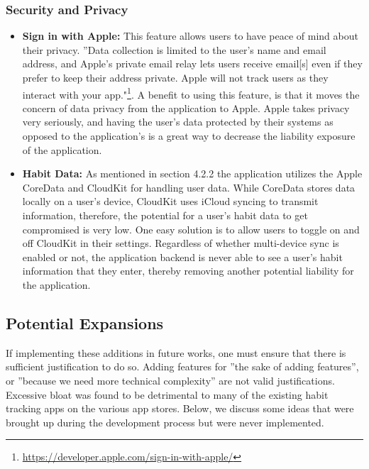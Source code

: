 \subsubsection{Security and Privacy}
\begin{itemize}
    \item \textbf{Sign in with Apple:} This feature allows users to have peace of mind about their privacy. ”Data collection is limited to the user’s name and email address, and Apple’s private email relay lets users receive email[s] even if they prefer to keep their address private. Apple will not track users as they interact with your app."\footnote{\url{https://developer.apple.com/sign-in-with-apple/}}. A benefit to using this feature, is that it moves the concern of data privacy from the application to Apple. Apple takes privacy very seriously, and having the user's data protected by their systems as opposed to the application's is a great way to decrease the liability exposure of the application.

    \item \textbf{Habit Data:} As mentioned in section 4.2.2 the application utilizes the Apple CoreData and CloudKit for handling user data. While CoreData stores data locally on a user’s device, CloudKit uses iCloud syncing to transmit information, therefore, the potential for a user’s habit data to get compromised is very low. One easy solution is to allow users to toggle on and off CloudKit in their settings. Regardless of whether multi-device sync is enabled or not, the application backend is never able to see a user’s habit information that they enter, thereby removing another potential liability for the application.
\end{itemize}

\subsection{Potential Expansions}
If implementing these additions in future works, one must ensure that there is sufficient justification to do so. Adding features for ”the sake of adding features”, or ”because we need more technical complexity” are not valid justifications. Excessive bloat was found to be detrimental to many of the existing habit tracking apps on the various app stores. Below, we discuss some ideas that were brought up during the development process but were never implemented.

